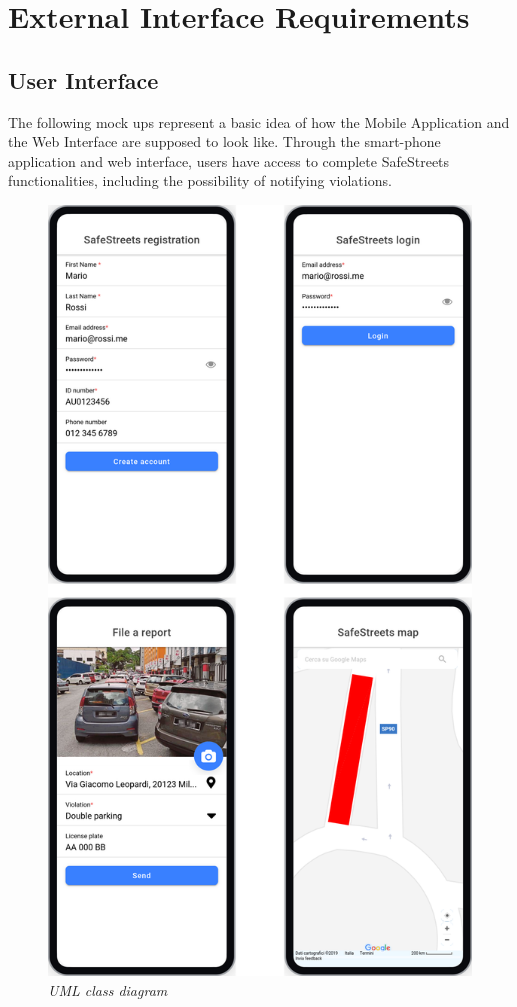 \section{External Interface Requirements}

\subsection{User Interface}
The following mock ups represent a basic idea of how the Mobile Application
and the Web Interface are supposed to look like.
Through the smart-phone application and web interface, users have access to complete SafeStreets functionalities, including the possibility of notifying violations.

\begin{figure}
  \centering
  \includegraphics[width=\textwidth,height=.95\textheight,keepaspectratio]{RASD_Images/UserInterface/All.jpg}
  \caption{\textit{UML class diagram}}
\end{figure}
\newpage


